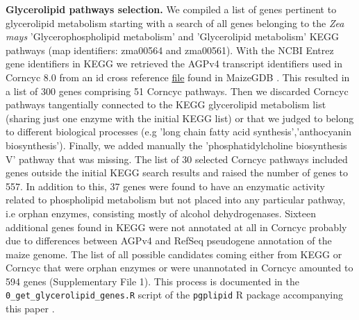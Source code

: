 \documentclass[9pt,twocolumn,twoside,lineno]{BioRxiv}
\begin{document}
\textbf{Glycerolipid pathways selection.}
We compiled a list of genes pertinent to glycerolipid metabolism starting with a search of all genes belonging to the \textit{Zea mays} 'Glycerophospholipid metabolism' and 'Glycerolipid metabolism' KEGG pathways \cite{kanehisa2019} (map identifiers: zma00564 and zma00561). 
With the NCBI Entrez gene identifiers in KEGG we retrieved the AGPv4 transcript identifiers used in Corncyc 8.0 \cite{portwood2019, walsh2016} from an id cross reference \href{https://www.maizegdb.org/search/gene/download_gene_xrefs.php?relative=v4}{file} found in MaizeGDB   \cite{portwood2019}.
This resulted in a list of 300 genes comprising 51 Corncyc pathways. 
Then we discarded Corncyc pathways  tangentially connected to the KEGG glycerolipid metabolism list (sharing just one enzyme with the initial KEGG list) or that we judged to belong to different biological processes (e.g 'long chain fatty acid synthesis','anthocyanin biosynthesis'). 
Finally, we added manually the 'phosphatidylcholine biosynthesis V' pathway that was missing. 
The list of 30 selected Corncyc pathways included genes outside the initial KEGG search results and raised the number of genes to 557. 
In addition to this, 37 genes were found to have an enzymatic activity related to phospholipid metabolism but not placed into any particular pathway, i.e orphan enzymes, consisting mostly of alcohol dehydrogenases. 
Sixteen additional genes found in KEGG were not annotated at all in Corncyc probably due to differences between AGPv4 and RefSeq pseudogene annotation of the maize genome. 
The list of all possible candidates coming either from KEGG or Corncyc that were orphan enzymes or were unannotated in Corncyc amounted to 594 genes (Supplementary File 1). 
This process is documented in the \verb|0_get_glycerolipid_genes.R| script of the \verb|pgplipid| R package accompanying this paper \cite{fausto_rodriguez_zapata_2020_4323410}.
\end{document}
